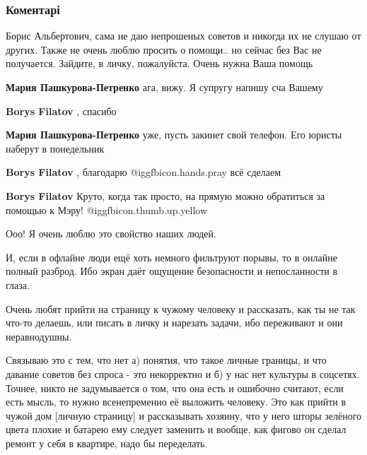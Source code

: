  
 
 
 
 
\subsubsection{Коментарі}
\label{sec:06_11_2021.fb.filatov_boris.1.strana_sovetov.cmt}

\begin{itemize} %

Борис Альбертович, сама не даю непрошеных советов и никогда их не слушаю от других.
Также не очень люблю просить о помощи.. но сейчас без Вас не получается. Зайдите, в личку, пожалуйста. Очень нужна Ваша помощь

\begin{itemize} %
\textbf{Мария Пашкурова-Петренко} ага, вижу.
Я супругу напишу сча Вашему

\textbf{Borys Filatov} , спасибо


\textbf{Мария Пашкурова-Петренко} уже, пусть закинет свой телефон. Его юристы наберут в понедельник

\textbf{Borys Filatov} , благодарю  @igg{fbicon.hands.pray}  всё сделаем

\textbf{Borys Filatov} Круто, когда так просто, на прямую можно обратиться за помощью к Мэру!  @igg{fbicon.thumb.up.yellow} 
\end{itemize} %


Ооо! Я очень люблю это свойство наших людей.

И, если в офлайне люди ещё хоть немного фильтруют порывы, то в онлайне полный
разброд. Ибо экран даёт ощущение безопасности и непосланности в глаза.

Очень любят прийти на страницу к чужому человеку и рассказать, как ты не так
что-то делаешь, или писать в личку и нарезать задачи, ибо переживают и они
неравнодушны.

Связываю это с тем, что нет а) понятия, что такое личные границы, и что давание
советов без спроса - это некорректно и б) у нас нет культуры в соцсетях.
Точнее, никто не задумывается о том, что она есть и ошибочно считают, если есть
мысль, то нужно всенепременно её выложить человеку. Это как прийти в чужой дом
[личную страницу] и рассказывать хозяину, что у него шторы зелёного цвета
плохие и батарею ему следует заменить и вообще, как фигово он сделал ремонт у
себя в квартире, надо бы переделать.


\end{itemize}
